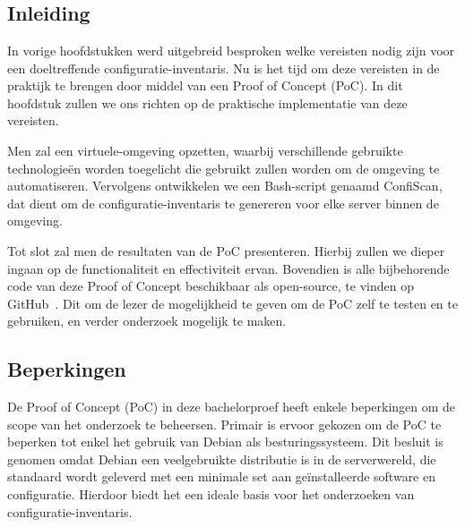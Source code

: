 
\chapter{}
\label{ch:poc}

\section{Inleiding}
\label{poc_inleiding}

In vorige hoofdstukken werd uitgebreid besproken welke vereisten nodig zijn voor een doeltreffende configuratie-inventaris.
Nu is het tijd om deze vereisten in de praktijk te brengen door middel van een Proof of Concept (PoC).
In dit hoofdstuk zullen we ons richten op de praktische implementatie van deze vereisten.

Men zal een virtuele-omgeving opzetten, waarbij verschillende gebruikte technologie\"en worden toegelicht die gebruikt zullen worden om de omgeving te automatiseren.
Vervolgens ontwikkelen we een Bash-script genaamd ConfiScan, dat dient om de configuratie-inventaris te genereren voor elke server binnen de omgeving.

Tot slot zal men de resultaten van de PoC presenteren.
Hierbij zullen we dieper ingaan op de functionaliteit en effectiviteit ervan.
Bovendien is alle bijbehorende code van deze Proof of Concept beschikbaar als open-source, te vinden op GitHub~\autocite{github-poc}.
Dit om de lezer de mogelijkheid te geven om de PoC zelf te testen en te gebruiken, en verder onderzoek mogelijk te maken.

\section{Beperkingen}
\label{poc_beperkingen}

De Proof of Concept (PoC) in deze bachelorproef heeft enkele beperkingen om de scope van het onderzoek te beheersen.
Primair is ervoor gekozen om de PoC te beperken tot enkel het gebruik van Debian als besturingssysteem.
Dit besluit is genomen omdat Debian een veelgebruikte distributie is in de serverwereld, die standaard wordt geleverd met een minimale set aan ge\"installeerde software en configuratie.
Hierdoor biedt het een ideale basis voor het onderzoeken van configuratie-inventaris.

